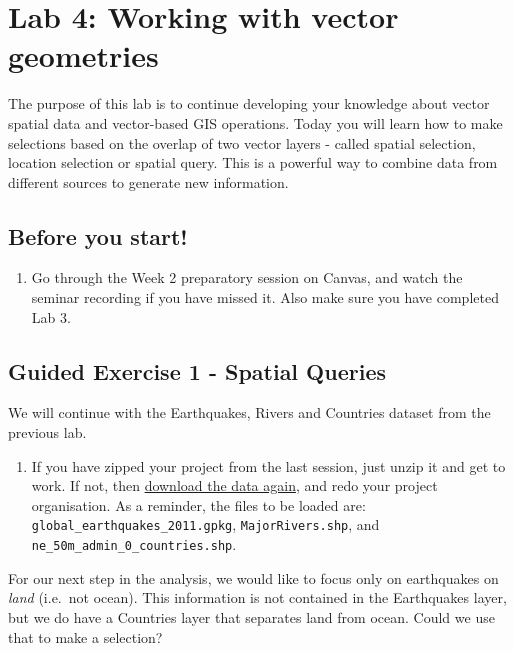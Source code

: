 \documentclass[
  letterpaper,
  DIV=11,
  numbers=noendperiod]{scrreprt}
\providecommand{\tightlist}{%
  \setlength{\itemsep}{0pt}\setlength{\parskip}{0pt}}\usepackage{longtable,booktabs,array}
\begin{document}
\chapter{Lab 4: Working with vector geometries}\label{sec-labvec2}

The purpose of this lab is to continue developing your knowledge about
vector spatial data and vector-based GIS operations. Today you will
learn how to make selections based on the overlap of two vector layers -
called spatial selection, location selection or spatial query. This is a
powerful way to combine data from different sources to generate new
information.

\section{Before you start!}\label{before-you-start-2}

\begin{enumerate}
\def\labelenumi{\arabic{enumi}.}
\tightlist
\item
  Go through the Week 2 preparatory session on Canvas, and watch the
  seminar recording if you have missed it. Also make sure you have
  completed Lab 3.
\end{enumerate}

\section{Guided Exercise 1 - Spatial
Queries}\label{guided-exercise-1---spatial-queries}

We will continue with the Earthquakes, Rivers and Countries dataset from
the previous lab.

\begin{enumerate}
\def\labelenumi{(\arabic{enumi})}
\setcounter{enumi}{107}
\tightlist
\item
  If you have zipped your project from the last session, just unzip it
  and get to work. If not, then
  \href{https://stir-my.sharepoint.com/:f:/g/personal/ala2_stir_ac_uk/EkD-gndA8ihElmcQFirYbPEBN6qvH2tzyLgJ8UujpCXi2Q?e=tsvmoG}{download
  the data again}, and redo your project organisation. As a reminder,
  the files to be loaded are: \texttt{global\_earthquakes\_2011.gpkg},
  \texttt{MajorRivers.shp}, and
  \texttt{ne\_50m\_admin\_0\_countries.shp}.
\end{enumerate}

For our next step in the analysis, we would like to focus only on
earthquakes on \emph{land} (i.e.~not ocean). This information is not
contained in the Earthquakes layer, but we do have a Countries layer
that separates land from ocean. Could we use that to make a selection?
\end{document}
